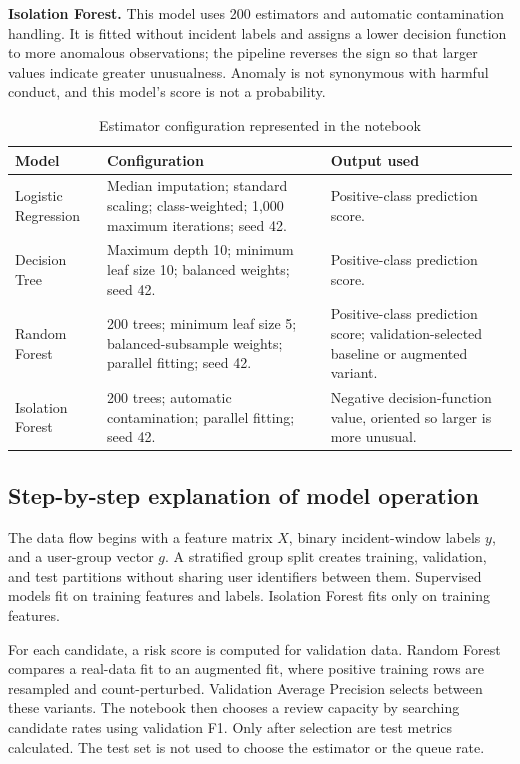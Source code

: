 \documentclass[12pt,a4paper,oneside]{report}
\newcommand{\tablefont}{\small}
\begin{document}
\textbf{Isolation Forest.} This model uses 200 estimators and automatic
contamination handling. It is fitted without incident labels and
assigns a lower decision function to more anomalous observations; the
pipeline reverses the sign so that larger values indicate greater
unusualness. Anomaly is not synonymous with harmful conduct, and this
model's score is not a probability.

\begin{table}[H]
\centering
\tablefont
\caption{Estimator configuration represented in the notebook}
\label{tab:model-settings}
\begin{tabularx}{\textwidth}{|p{}|p{}|Y|}
\hline
\textbf{Model} & \textbf{Configuration} & \textbf{Output used}\\\hline
Logistic Regression & Median imputation; standard scaling; class-weighted; 1,000 maximum iterations; seed 42. & Positive-class prediction score.\\\hline
Decision Tree & Maximum depth 10; minimum leaf size 10; balanced weights; seed 42. & Positive-class prediction score.\\\hline
Random Forest & 200 trees; minimum leaf size 5; balanced-subsample weights; parallel fitting; seed 42. & Positive-class prediction score; validation-selected baseline or augmented variant.\\\hline
Isolation Forest & 200 trees; automatic contamination; parallel fitting; seed 42. & Negative decision-function value, oriented so larger is more unusual.\\\hline
\end{tabularx}
\end{table}

\subsection{Step-by-step explanation of model operation}
The data flow begins with a feature matrix \(X\), binary incident-window
labels \(y\), and a user-group vector \(g\). A stratified group split
creates training, validation, and test partitions without sharing user
identifiers between them. Supervised models fit on training features
and labels. Isolation Forest fits only on training features.

For each candidate, a risk score is computed for validation data.
Random Forest compares a real-data fit to an augmented fit, where
positive training rows are resampled and count-perturbed. Validation
Average Precision selects between these variants. The notebook then
chooses a review capacity by searching candidate rates using validation
F1. Only after selection are test metrics calculated. The test set is
not used to choose the estimator or the queue rate.
\end{document}
